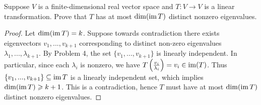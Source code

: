\documentclass[10pt,twoside,openany]{memoir}
\begin{document}
\begin{problem}[S18, P5]
    Suppose $V$ is a finite-dimensional real vector space and $T:V \rightarrow V$ is a linear transformation. Prove that $T$ has at most $\dim (\operatorname{im} T)$ distinct nonzero eigenvalues.
\end{problem}
    {\color{blue} \begin{proof}
        Let $\dim (\operatorname{im} T) = k$. Suppose towards contradiction there exists eigenvectors $v_1,...,v_{k+1}$ corresponding to distinct non-zero eigenvalues $\lambda_1,...,\lambda_{k+1}$. By Problem 4, the set $\{v_1,...,v_{k+1}\}$ is linearly independent. In particular, since each $\lambda_i$ is nonzero, we have $T \left( \frac{v_i}{\lambda_i} \right) = v_i \in \operatorname{im}(T)$. Thus $\{v_1,...,v_{k+1}\} \subseteq \operatorname{im} T$ is a linearly independent set, which implies $\dim(\operatorname{im} T) \geqslant k+1$. This is a contradiction, hence $T$ must have at most $\dim (\operatorname{im} T)$ distinct nonzero eigenvalues.
    \end{proof}}
\end{document}
